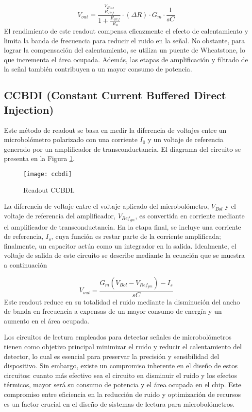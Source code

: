         \begin{equation}
        V_{out} = \frac{\frac{V_{Bias}}{R_{Ref}}}{1+\frac{R_{Ref}}{R_{0}}}\cdot (\Delta R)\cdot G_{m}\cdot \frac{1}{sC}
        \label{eq:wbda}
        \end{equation}
El rendimiento de este readout compensa eficazmente el efecto de calentamiento y limita la banda de frecuencia para reducir el ruido en la señal. No obstante, para lograr la compensación del calentamiento, se utiliza un puente de Wheatstone, lo que incrementa el área ocupada. Además, las etapas de amplificación y filtrado de la señal también contribuyen a un mayor consumo de potencia.        
\newpage
\subsection{CCBDI (Constant Current Buffered Direct Injection)}
Este método de readout se basa en medir la diferencia de voltajes entre un microbolómetro polarizado con una corriente $I_{0}$ y un voltaje de referencia generado por un amplificador de transconductancia. El diagrama del circuito se presenta en la Figura \ref{fig:ccbdi}.
            \begin{figure}[hbtp]
                \centering
                \texttt{[image: ccbdi]}
                \caption{Readout CCBDI.}
                \label{fig:ccbdi}
            \end{figure}

La diferencia de voltaje entre el voltaje aplicado del microbolómetro, $V_{Bol}$ y el voltaje de referencia del amplificador, $V_{Ref_{gm}}$, es convertida en corriente mediante el amplificador de transconductancia. En la etapa final, se incluye una corriente de referencia, $I_{s}$, cuya función es restar parte de la corriente amplificada; finalmente, un capacitor actúa como un integrador en la salida. Idealmente, el voltaje de salida de este circuito se describe mediante la ecuación que se muestra a continuación

        \begin{equation}
        V_{out} = \frac{G_{m}(V_{Bol}-V_{Ref_{gm}})-I_{s}}{sC}
        \label{eq:ccbdi}
        \end{equation}
Este readout reduce en su totalidad el ruido mediante la disminución del ancho de banda en frecuencia a expensas de un mayor consumo de energía y un aumento en el área ocupada.

\newpage
Los circuitos de lectura empleados para detectar señales de microbolómetros tienen como objetivo principal minimizar el ruido y reducir el calentamiento del detector, lo cual es esencial para preservar la precisión y sensibilidad del dispositivo. Sin embargo, existe un compromiso inherente en el diseño de estos circuitos: cuanto más efectivo sea el circuito en disminuir el ruido y los efectos térmicos, mayor será su consumo de potencia y el área ocupada en el chip. Este compromiso entre eficiencia en la reducción de ruido y optimización de recursos es un factor crucial en el diseño de sistemas de lectura para microbolómetros.          


